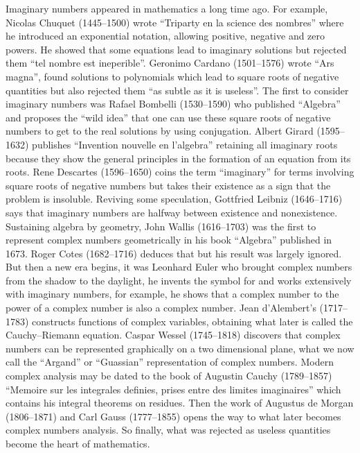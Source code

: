 \documentclass[a4paper,12pt]{book}
\begin{document}
Imaginary numbers appeared in mathematics a long time ago. For example,
Nicolas Chuquet (1445--1500) wrote ``Triparty en la science des nombres''
where he introduced an exponential notation, allowing positive, negative and
zero powers. He showed that some equations lead to imaginary solutions but
rejected them ``tel nombre est ineperible''. Geronimo Cardano (1501--1576)
wrote ``Ars magna'', found solutions to polynomials which lead to square
roots of negative quantities but also rejected them ``as subtle as it is
useless''. The first to consider imaginary numbers was Rafael Bombelli
(1530--1590) who published ``Algebra'' and proposes the ``wild idea'' that
one can use these square roots of negative numbers to get to the real
solutions by using conjugation. Albert Girard (1595--1632) publishes
``Invention nouvelle en l'algebra'' retaining all imaginary roots because
they show the general principles in the formation of an equation from its
roots. Rene Descartes (1596--1650) coins the term ``imaginary'' for terms
involving square roots of negative numbers but takes their existence as a
sign that the problem is insoluble. Reviving some speculation, Gottfried
Leibniz (1646--1716) says that imaginary numbers are halfway between
existence and nonexistence. Sustaining algebra by geometry, John Wallis
(1616--1703) was the first to represent complex numbers geometrically in his
book ``Algebra'' published in 1673. Roger Cotes (1682--1716) deduces that \coordHE{} but his result was largely ignored. But then a new era begins, it
was Leonhard Euler who brought complex numbers from the shadow to the
daylight, he invents the symbol \coordHE{} for \coordHE{} and works extensively
with imaginary numbers, for example, he shows that a complex number to the
power of a complex number is also a complex number. Jean d'Alembert's
(1717--1783) constructs functions of complex variables, obtaining what later
is called the Cauchy--Riemann equation. Caspar Wessel (1745--1818) discovers
that complex numbers can be represented graphically on a two dimensional
plane, what we now call the ``Argand'' or ``Guassian'' representation of
complex numbers. Modern complex analysis may be dated to the book of
Augustin Cauchy (1789--1857) ``Memoire sur les integrales definies, prises
entre des limites imaginaires'' which contains his integral theorems on
residues. Then the work of Augustus de Morgan (1806--1871) and Carl Gauss
(1777--1855) opens the way to what later becomes complex numbers analysis.
So finally, what was rejected as useless quantities become the heart of
mathematics.
\end{document}
